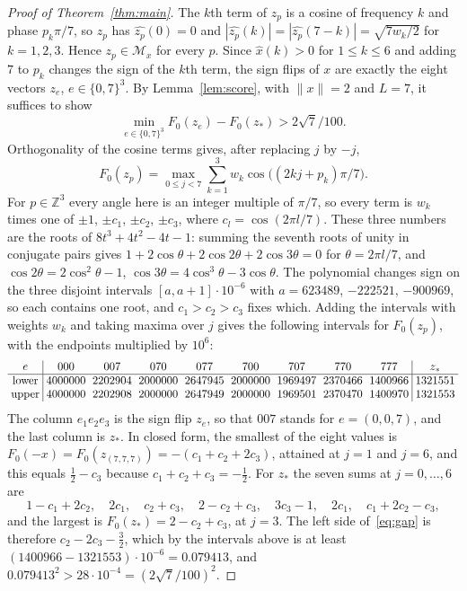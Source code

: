 \documentclass[11pt]{article}
\theoremstyle{remark}
\begin{document}
\begin{proof}[Proof of Theorem~\ref{thm:main}]
The $k$th term of $z_p$ is a cosine of frequency $k$ and phase $p_k\pi/7$, so $z_p$ has $\widehat{z_p}(0)=0$ and $|\widehat{z_p}(k)|=|\widehat{z_p}(7-k)|=\sqrt{7w_k/2}$ for $k=1,2,3$. Hence $z_p\in\mathcal M_x$ for every $p$. Since $\widehat x(k)>0$ for $1\le k\le 6$ and adding $7$ to $p_k$ changes the sign of the $k$th term, the sign flips of $x$ are exactly the eight vectors $z_e$, $e\in\{0,7\}^3$. By Lemma~\ref{lem:score}, with $\|x\|=2$ and $L=7$, it suffices to show
\begin{equation}\label{eq:gap}
\min_{e\in\{0,7\}^3}F_0(z_e)-F_0(z_*)>2\sqrt7/100 .
\end{equation}
Orthogonality of the cosine terms gives, after replacing $j$ by $-j$,
\[
F_0(z_p)=\max_{0\le j<7}\sum_{k=1}^3w_k\cos\bigl((2kj+p_k)\pi/7\bigr).
\]
For $p\in\mathbb Z^3$ every angle here is an integer multiple of $\pi/7$, so every term is $w_k$ times one of $\pm1$, $\pm c_1$, $\pm c_2$, $\pm c_3$, where $c_l=\cos(2\pi l/7)$. These three numbers are the roots of $8t^3+4t^2-4t-1$: summing the seventh roots of unity in conjugate pairs gives $1+2\cos\theta+2\cos 2\theta+2\cos3\theta=0$ for $\theta=2\pi l/7$, and $\cos2\theta=2\cos^2\theta-1$, $\cos3\theta=4\cos^3\theta-3\cos\theta$. The polynomial changes sign on the three disjoint intervals $[a,a+1]\cdot10^{-6}$ with $a=623489$, $-222521$, $-900969$, so each contains one root, and $c_1>c_2>c_3$ fixes which. Adding the intervals with weights $w_k$ and taking maxima over $j$ gives the following intervals for $F_0(z_p)$, with the endpoints multiplied by $10^6$:
\[
\setlength{\arraycolsep}{3pt}
\begin{array}{c|cccccccc|c}
e & 000 & 007 & 070 & 077 & 700 & 707 & 770 & 777 & z_*\\\hline
\text{lower} & 4000000 & 2202904 & 2000000 & 2647945 & 2000000 & 1969497 & 2370466 & 1400966 & 1321551\\
\text{upper} & 4000000 & 2202908 & 2000000 & 2647949 & 2000000 & 1969501 & 2370470 & 1400970 & 1321553
\end{array}
\]
The column $e_1e_2e_3$ is the sign flip $z_e$, so that $007$ stands for $e=(0,0,7)$, and the last column is $z_*$. In closed form, the smallest of the eight values is $F_0(-x)=F_0(z_{(7,7,7)})=-(c_1+c_2+2c_3)$, attained at $j=1$ and $j=6$, and this equals $\tfrac12-c_3$ because $c_1+c_2+c_3=-\tfrac12$. For $z_*$ the seven sums at $j=0,\dots,6$ are
\[
1-c_1+2c_2,\quad 2c_1,\quad c_2+c_3,\quad 2-c_2+c_3,\quad 3c_3-1,\quad 2c_1,\quad c_1+2c_2-c_3 ,
\]
and the largest is $F_0(z_*)=2-c_2+c_3$, at $j=3$. The left side of~\eqref{eq:gap} is therefore $c_2-2c_3-\tfrac32$, which by the intervals above is at least $(1400966-1321553)\cdot10^{-6}=0.079413$, and $0.079413^2>28\cdot10^{-4}=(2\sqrt7/100)^2$.
\end{proof}
\end{document}
